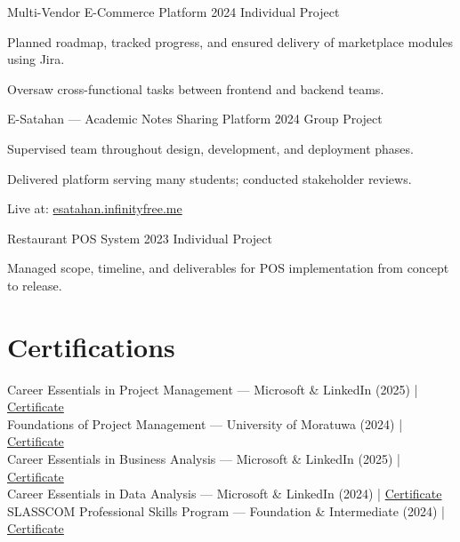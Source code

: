 \documentclass[letterpaper,11pt]{article}
\begin{document}
\vspace{12pt}
{Multi-Vendor E-Commerce Platform}
{2024}
{Individual Project}{
  \item Planned roadmap, tracked progress, and ensured delivery of marketplace modules using Jira.
  \item Oversaw cross-functional tasks between frontend and backend teams.
}

\newpage

\vspace{12pt}
{E-Satahan — Academic Notes Sharing Platform}
{2024}
{Group Project}{
  \item Supervised team throughout design, development, and deployment phases.
  \item Delivered platform serving many students; conducted stakeholder reviews.
  \item Live at: \href{https://esatahan.infinityfree.me}{esatahan.infinityfree.me}
}

\vspace{6pt}
{Restaurant POS System}
{2023}
{Individual Project}{
  \item Managed scope, timeline, and deliverables for POS implementation from concept to release.
}


\section{Certifications}
\vspace{-1pt}

\textnormal{Career Essentials in Project Management} — Microsoft \& LinkedIn (2025) | \href{https://www.linkedin.com/posts/vindya-kodithuwakku-bb6187202_projectmanagement-careeressentials-microsoft-activity-7374470702059438080-zbfj}{Certificate}\\[3pt]
\textnormal{Foundations of Project Management} — University of Moratuwa (2024) | \href{https://open.uom.lk/lms/mod/customcert/verify_certificate.php?code=ATuxOYBBAE&qrcode=1}{Certificate}\\[3pt]
\textnormal{Career Essentials in Business Analysis} — Microsoft \& LinkedIn (2025) | \href{https://www.linkedin.com/posts/vindya-kodithuwakku-bb6187202_businessanalysis-careeressentials-microsoft-activity-7371193871919398914-PKak}{Certificate}\\[3pt]
\textnormal{Career Essentials in Data Analysis} — Microsoft \& LinkedIn (2024) | \href{https://www.linkedin.com/posts/vindya-kodithuwakku-bb6187202_dataanalysis-careeressentials-microsoft-activity-7379124237950750720-kKmD}{Certificate}\\[3pt]
\textnormal{SLASSCOM Professional Skills Program} — Foundation \& Intermediate (2024) | \href{https://www.linkedin.com/posts/vindya-kodithuwakku-bb6187202_slasscom-professionalskillsprogram-careerdevelopment-activity-7379038487246860288-PRA0}{Certificate}
\end{document}
